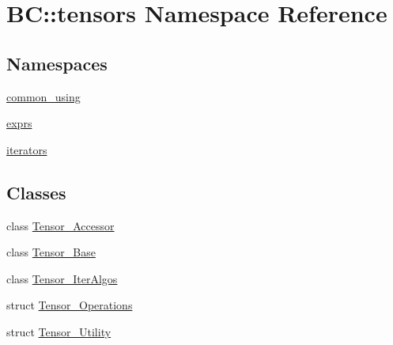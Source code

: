 \hypertarget{namespaceBC_1_1tensors}{}\section{BC\+:\+:tensors Namespace Reference}
\label{namespaceBC_1_1tensors}
\subsection*{Namespaces}
\begin{DoxyCompactItemize}
\item 
 \hyperlink{namespaceBC_1_1tensors_1_1common__using}{common\+\_\+using}
\item 
 \hyperlink{namespaceBC_1_1tensors_1_1exprs}{exprs}
\item 
 \hyperlink{namespaceBC_1_1tensors_1_1iterators}{iterators}
\end{DoxyCompactItemize}
\subsection*{Classes}
\begin{DoxyCompactItemize}
\item 
class \hyperlink{classBC_1_1tensors_1_1Tensor__Accessor}{Tensor\+\_\+\+Accessor}
\item 
class \hyperlink{classBC_1_1tensors_1_1Tensor__Base}{Tensor\+\_\+\+Base}
\item 
class \hyperlink{classBC_1_1tensors_1_1Tensor__IterAlgos}{Tensor\+\_\+\+Iter\+Algos}
\item 
struct \hyperlink{structBC_1_1tensors_1_1Tensor__Operations}{Tensor\+\_\+\+Operations}
\item 
struct \hyperlink{structBC_1_1tensors_1_1Tensor__Utility}{Tensor\+\_\+\+Utility}
\end{DoxyCompactItemize}
